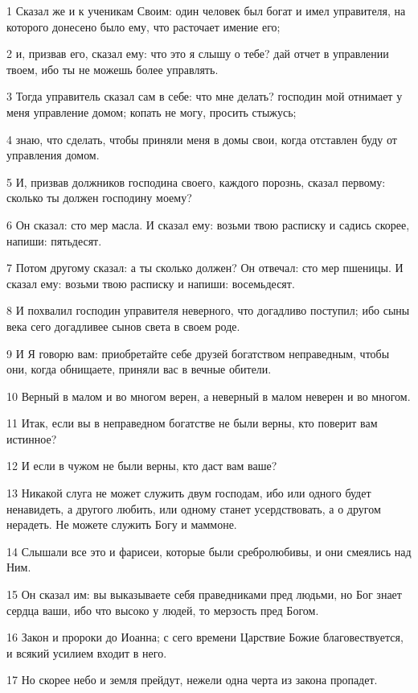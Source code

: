 \par 1 Сказал же и к ученикам Своим: один человек был богат и имел управителя, на которого донесено было ему, что расточает имение его;
\par 2 и, призвав его, сказал ему: что это я слышу о тебе? дай отчет в управлении твоем, ибо ты не можешь более управлять.
\par 3 Тогда управитель сказал сам в себе: что мне делать? господин мой отнимает у меня управление домом; копать не могу, просить стыжусь;
\par 4 знаю, что сделать, чтобы приняли меня в домы свои, когда отставлен буду от управления домом.
\par 5 И, призвав должников господина своего, каждого порознь, сказал первому: сколько ты должен господину моему?
\par 6 Он сказал: сто мер масла. И сказал ему: возьми твою расписку и садись скорее, напиши: пятьдесят.
\par 7 Потом другому сказал: а ты сколько должен? Он отвечал: сто мер пшеницы. И сказал ему: возьми твою расписку и напиши: восемьдесят.
\par 8 И похвалил господин управителя неверного, что догадливо поступил; ибо сыны века сего догадливее сынов света в своем роде.
\par 9 И Я говорю вам: приобретайте себе друзей богатством неправедным, чтобы они, когда обнищаете, приняли вас в вечные обители.
\par 10 Верный в малом и во многом верен, а неверный в малом неверен и во многом.
\par 11 Итак, если вы в неправедном богатстве не были верны, кто поверит вам истинное?
\par 12 И если в чужом не были верны, кто даст вам ваше?
\par 13 Никакой слуга не может служить двум господам, ибо или одного будет ненавидеть, а другого любить, или одному станет усердствовать, а о другом нерадеть. Не можете служить Богу и маммоне.
\par 14 Слышали все это и фарисеи, которые были сребролюбивы, и они смеялись над Ним.
\par 15 Он сказал им: вы выказываете себя праведниками пред людьми, но Бог знает сердца ваши, ибо что высоко у людей, то мерзость пред Богом.
\par 16 Закон и пророки до Иоанна; с сего времени Царствие Божие благовествуется, и всякий усилием входит в него.
\par 17 Но скорее небо и земля прейдут, нежели одна черта из закона пропадет.
